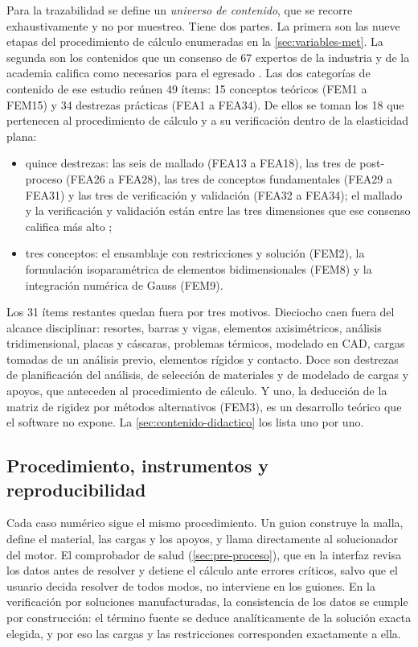 Para la trazabilidad se define un \emph{universo de contenido}, que se recorre exhaustivamente y no por muestreo. Tiene dos partes. La primera son las nueve etapas del procedimiento de cálculo enumeradas en la \autoref{sec:variables-met}. La segunda son los contenidos que un consenso de 67 expertos de la industria y de la academia califica como necesarios para el egresado \autocite[pp.~1162-1163]{perezsantiago2023fem}. Las dos categorías de contenido de ese estudio reúnen 49 ítems: 15 conceptos teóricos (FEM1 a FEM15) y 34 destrezas prácticas (FEA1 a FEA34). De ellos se toman los 18 que pertenecen al procedimiento de cálculo y a su verificación dentro de la elasticidad plana:
\begin{itemize}
    \item quince destrezas: las seis de mallado (FEA13 a FEA18), las tres de post-proceso (FEA26 a FEA28), las tres de conceptos fundamentales (FEA29 a FEA31) y las tres de verificación y validación (FEA32 a FEA34); el mallado y la verificación y validación están entre las tres dimensiones que ese consenso califica más alto \autocite[p.~1168]{perezsantiago2023fem};
    \item tres conceptos: el ensamblaje con restricciones y solución (FEM2), la formulación isoparamétrica de elementos bidimensionales (FEM8) y la integración numérica de Gauss (FEM9).
\end{itemize}
Los 31 ítems restantes quedan fuera por tres motivos. Dieciocho caen fuera del alcance disciplinar: resortes, barras y vigas, elementos axisimétricos, análisis tridimensional, placas y cáscaras, problemas térmicos, modelado en CAD, cargas tomadas de un análisis previo, elementos rígidos y contacto. Doce son destrezas de planificación del análisis, de selección de materiales y de modelado de cargas y apoyos, que anteceden al procedimiento de cálculo. Y uno, la deducción de la matriz de rigidez por métodos alternativos (FEM3), es un desarrollo teórico que el software no expone. La \autoref{sec:contenido-didactico} los lista uno por uno.

\subsection{Procedimiento, instrumentos y reproducibilidad}
\label{sec:validacion-datos}

Cada caso numérico sigue el mismo procedimiento. Un guion construye la malla, define el material, las cargas y los apoyos, y llama directamente al solucionador del motor. El comprobador de salud (\autoref{sec:pre-proceso}), que en la interfaz revisa los datos antes de resolver y detiene el cálculo ante errores críticos, salvo que el usuario decida resolver de todos modos, no interviene en los guiones. En la verificación por soluciones manufacturadas, la consistencia de los datos se cumple por construcción: el término fuente se deduce analíticamente de la solución exacta elegida, y por eso las cargas y las restricciones corresponden exactamente a ella.

